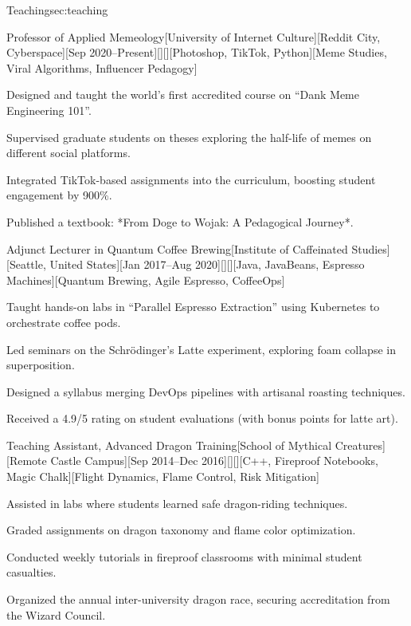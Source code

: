\documentclass[11pt, letterpaper, extended ]{i-am-developer}
\begin{document}
\begin{devCVSection}{Teaching}{sec:teaching}
  \begin{devRole}{Professor of Applied Memeology}[University of
    Internet Culture][Reddit City, Cyberspace][Sep
    2020--Present][\faGraduationCap][\faMapMarker][Photoshop, TikTok,
    Python][Meme Studies, Viral Algorithms, Influencer Pedagogy]
    \begin{devItemize}
    \item Designed and taught the world’s first accredited course on
      “Dank Meme Engineering 101”.
    \item Supervised graduate students on theses exploring the
      half-life of memes on different social platforms.
    \item Integrated TikTok-based assignments into the curriculum,
      boosting student engagement by 900\%.
    \item Published a textbook: *From Doge to Wojak: A Pedagogical Journey*.
    \end{devItemize}
  \end{devRole}

  \begin{devRole}{Adjunct Lecturer in Quantum Coffee
    Brewing}[Institute of Caffeinated Studies][Seattle, United
    States][Jan 2017--Aug 2020][\faCoffee][\faMapMarker][Java,
    JavaBeans, Espresso Machines][Quantum Brewing, Agile Espresso, CoffeeOps]
    \begin{devItemize}
    \item Taught hands-on labs in “Parallel Espresso Extraction”
      using Kubernetes to orchestrate coffee pods.
    \item Led seminars on the Schrödinger’s Latte experiment,
      exploring foam collapse in superposition.
    \item Designed a syllabus merging DevOps pipelines with artisanal
      roasting techniques.
    \item Received a 4.9/5 rating on student evaluations (with bonus
      points for latte art).
    \end{devItemize}
  \end{devRole}

  \begin{devRole}{Teaching Assistant, Advanced Dragon
    Training}[School of Mythical Creatures][Remote Castle Campus][Sep
    2014--Dec 2016][\faFire][\faMapMarker][C++, Fireproof Notebooks,
    Magic Chalk][Flight Dynamics, Flame Control, Risk Mitigation]
    \begin{devItemize}
    \item Assisted in labs where students learned safe dragon-riding techniques.
    \item Graded assignments on dragon taxonomy and flame color optimization.
    \item Conducted weekly tutorials in fireproof classrooms with
      minimal student casualties.
    \item Organized the annual inter-university dragon race, securing
      accreditation from the Wizard Council.
    \end{devItemize}
  \end{devRole}


\end{devCVSection}
\end{document}
